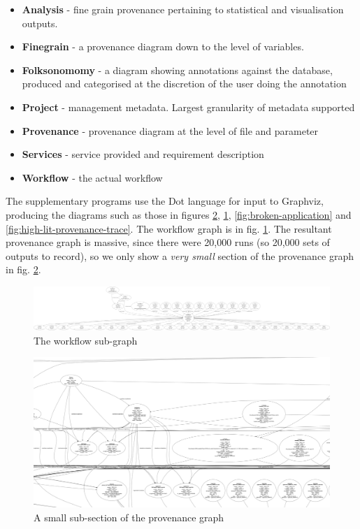 \documentclass[runningheads]{llncs}
\begin{document}
\begin{itemize} \item \textbf{Analysis} - fine grain provenance pertaining to
            statistical and visualisation outputs.

        \item \textbf{Finegrain} - a provenance diagram down to the level of
        variables.  \item \textbf{Folksonomomy} - a diagram showing annotations
            against the database, produced and categorised at the discretion of
            the user doing the annotation \item \textbf{Project} - management
            metadata. Largest granularity of metadata supported \item
            \textbf{Provenance} - provenance diagram at the level of file and
        parameter \item \textbf{Services} - service provided and requirement
            description \item \textbf{Workflow} - the actual workflow
\end{itemize}

The supplementary programs use the Dot language for input to Graphviz\cite{ellson2002graphviz}, producing the diagrams such as those in figures
\ref{fig:sub-provenance}, \ref{fig:workflow}, \ref{fig:broken-application} and
\ref{fig:high-lit-provenance-trace}. The workflow graph is in
fig. \ref{fig:workflow}. The resultant provenance graph is massive, since there were 20,000 runs (so 20,000 sets of outputs to record), so we only show a \textit{very small} section of the provenance graph in fig.
\ref{fig:sub-provenance}. 

\begin{figure} %
\includegraphics[width=\textwidth]{img/workflow.pdf}
\caption{The workflow sub-graph} \label{fig:workflow} \end{figure}

\begin{figure}
\includegraphics[width=\textwidth]{img/subsection-of-provenance.png}
\caption{A small sub-section of the provenance graph} \label{fig:sub-provenance}
\end{figure}
\end{document}
